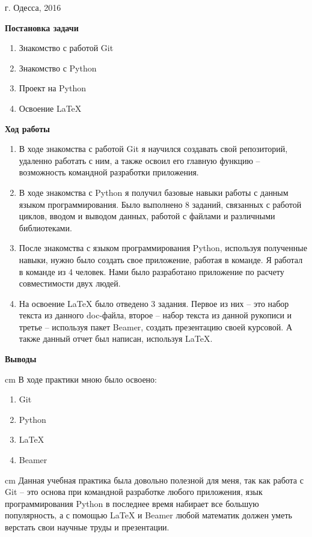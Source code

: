 \documentclass[12pt,a4paper]{scrartcl}
\begin{document}
\par\bigskip
\begin{center}
г. Одесса, 2016
\end{center}
\newpage
\begin{center}
\Large\textbf{Постановка задачи}
\end{center}
\begin{enumerate}
\item Знакомство с работой Git
\item Знакомство с Python
\item Проект на Python
\item Освоение LaTeX
\end{enumerate}
\newpage
\begin{center}
\Large\textbf{Ход работы}
\end{center}
\begin{enumerate}
\item В ходе знакомства с работой Git я научился создавать свой репозиторий, удаленно работать с ним, а также освоил его главную функцию – возможность командной разработки приложения.
\item В ходе знакомства с Python я получил базовые навыки работы с данным языком программирования. Было выполнено 8 заданий, связанных с работой циклов, вводом и выводом данных, работой с файлами и различными библиотеками.
\item После знакомства с языком программирования Python, используя полученные навыки, нужно было создать свое приложение, работая в команде. Я работал в команде из 4 человек. Нами было разработано приложение по расчету совместимости двух людей.
\item На освоение LaTeX было отведено 3 задания. Первое из них – это набор текста из данного doc-файла, второе – набор текста из данной рукописи и третье – используя пакет Beamer, создать презентацию своей курсовой. А также данный отчет был написан, используя LaTeX.
\end{enumerate}
\par\bigskip
\begin{center}
\Large\textbf{Выводы}
\end{center}
\parbox{14,5 cm}{ cm В ходе практики мною было освоено:}
\begin{enumerate}
\item Git
\item Python
\item LaTeX
\item Beamer
\end{enumerate}
\parbox{14,5 cm}{ cm Данная учебная практика была довольно полезной для меня, так как работа с Git – это основа при командной разработке любого приложения, язык программирования Python в последнее время набирает все большую популярность, а с помощью LaTeX и Beamer любой математик должен уметь верстать свои научные труды и презентации. }
\end{document}
